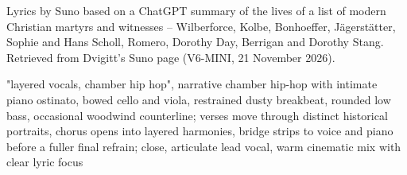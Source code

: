 
\begin{notes}
Lyrics by Suno based on a ChatGPT summary of the lives of a list of modern Christian martyrs and witnesses -- Wilberforce, Kolbe, Bonhoeffer, Jägerstätter, Sophie and Hans Scholl, Romero, Dorothy Day, Berrigan and Dorothy Stang. Retrieved from Dvigitt's Suno page (V6-MINI, 21 November 2026).
\end{notes}
\begin{style}
"layered vocals, chamber hip hop", narrative chamber hip-hop with intimate piano ostinato, bowed cello and viola, restrained dusty breakbeat, rounded low bass, occasional woodwind counterline; verses move through distinct historical portraits, chorus opens into layered harmonies, bridge strips to voice and piano before a fuller final refrain; close, articulate lead vocal, warm cinematic mix with clear lyric focus
\end{style}
